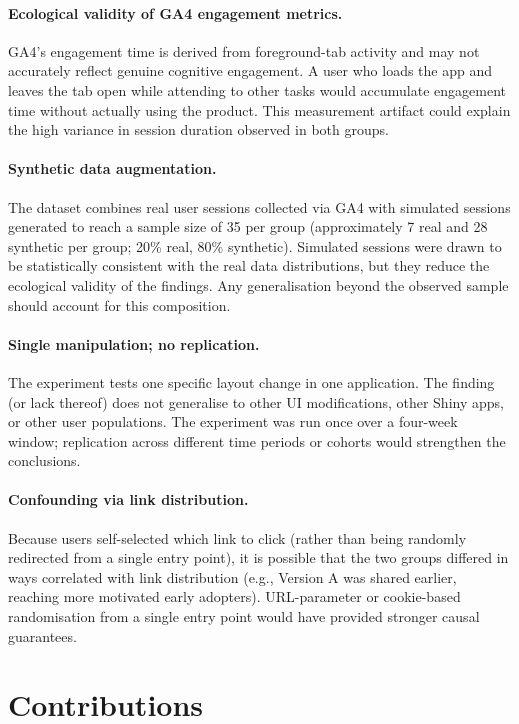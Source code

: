 \documentclass{article}
\begin{document}
\paragraph{Ecological validity of GA4 engagement metrics.}
GA4's engagement time is derived from foreground-tab activity and may not accurately reflect genuine cognitive engagement. A user who loads the app and leaves the tab open while attending to other tasks would accumulate engagement time without actually using the product. This measurement artifact could explain the high variance in session duration observed in both groups.

\paragraph{Synthetic data augmentation.}
The dataset combines real user sessions collected via GA4 with simulated sessions generated to reach a sample size of 35 per group (approximately 7 real and 28 synthetic per group; 20\% real, 80\% synthetic). Simulated sessions were drawn to be statistically consistent with the real data distributions, but they reduce the ecological validity of the findings. Any generalisation beyond the observed sample should account for this composition.

\paragraph{Single manipulation; no replication.}
The experiment tests one specific layout change in one application. The finding (or lack thereof) does not generalise to other UI modifications, other Shiny apps, or other user populations. The experiment was run once over a four-week window; replication across different time periods or cohorts would strengthen the conclusions.

\paragraph{Confounding via link distribution.}
Because users self-selected which link to click (rather than being randomly redirected from a single entry point), it is possible that the two groups differed in ways correlated with link distribution (e.g., Version A was shared earlier, reaching more motivated early adopters). URL-parameter or cookie-based randomisation from a single entry point would have provided stronger causal guarantees.

\newpage
\section*{Contributions}
\end{document}
